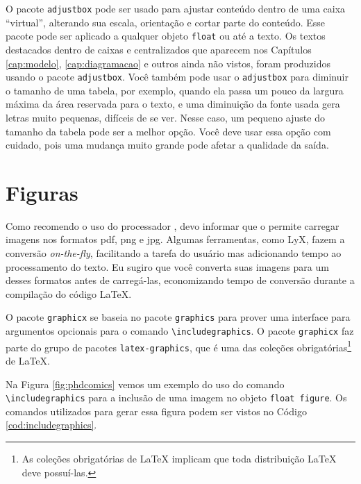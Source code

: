 O pacote \texttt{adjustbox} pode ser usado para ajustar conteúdo dentro de uma caixa ``virtual'', alterando sua escala, orientação e cortar parte do conteúdo. Esse pacote pode ser aplicado a qualquer objeto \texttt{float} ou até a texto. Os textos destacados dentro de caixas e centralizados que aparecem nos Capítulos \ref{cap:modelo}, \ref{cap:diagramacao}  e outros ainda não vistos, foram produzidos usando o pacote \texttt{adjustbox}. Você também pode usar o \texttt{adjustbox} para diminuir o tamanho de uma tabela, por exemplo, quando ela passa um pouco da largura máxima da área reservada para o texto, e uma diminuição da fonte usada gera letras muito pequenas, difíceis de se ver. Nesse caso, um pequeno ajuste do tamanho da tabela pode ser a melhor opção. Você deve usar essa opção com cuidado, pois uma mudança muito grande pode afetar a qualidade da saída.

\section{Figuras}

Como recomendo o uso do processador , devo informar que o  permite carregar imagens nos formatos \gls{pdf}, \gls{png} e \gls{jpg}. Algumas ferramentas, como LyX, fazem a conversão \textit{on-the-fly}, facilitando a tarefa do usuário mas adicionando tempo ao processamento do texto. Eu sugiro que você converta suas imagens para um desses formatos antes de carregá-las, economizando tempo de conversão durante a compilação do código \LaTeX{}.

O pacote \texttt{graphicx} se baseia no pacote \texttt{graphics} para prover uma interface para argumentos opcionais para o comando \texttt{\textbackslash{}includegraphics}. O pacote \texttt{graphicx} faz parte do grupo de pacotes \texttt{latex-graphics}, que é uma das coleções obrigatórias\footnote{As coleções obrigatórias de \LaTeX{} implicam que toda distribuição \LaTeX{} deve possuí-las.} de \LaTeX{}.

Na Figura \ref{fig:phdcomics}  vemos um exemplo do uso do comando \texttt{\textbackslash{}includegraphics} para a inclusão de uma imagem no objeto \texttt{float figure}. Os comandos utilizados para gerar essa figura podem ser vistos no Código \ref{cod:includegraphics}.

